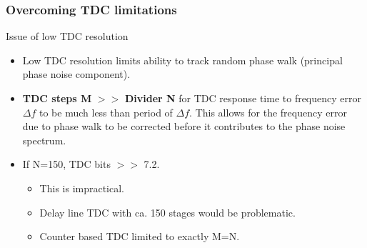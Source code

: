 \documentclass[t, screen, aspectratio=43]{beamer}
\begin{document}
\begin{frame}
	\frametitle{Overcoming TDC limitations}
	\begin{block}{Issue of low TDC resolution}
		\begin{itemize}
			\scriptsize
			\item Low TDC resolution limits ability to track random phase walk (principal phase noise component).
			\item \textbf{TDC steps M} $>>$ \textbf{Divider N} for TDC response time to frequency error $\Delta f$ to be much less than period of $\Delta f$. This allows for the frequency error due to phase walk to be corrected before it contributes to the phase noise spectrum.
			\item If N=150, TDC bits $>>$ 7.2. 
			\begin{itemize}
				\scriptsize
				\item This is impractical. 
				\item Delay line TDC with ca. 150 stages would be problematic.
				\item Counter based TDC limited to exactly M=N.
			\end{itemize}		
		\end{itemize} 
	\end{block}
\end{frame}
\end{document}
